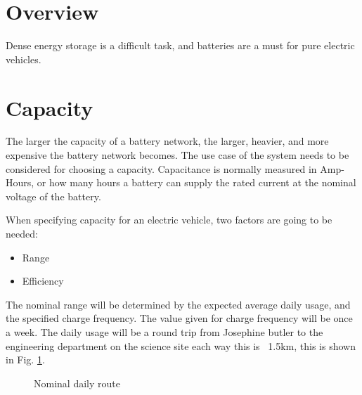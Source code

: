 \documentclass{article}
\begin{document}
\section{Overview}
Dense energy storage is a difficult task, and batteries are a must for pure electric vehicles.
\section{Capacity}
The larger the capacity of a battery network, the larger, heavier, and more expensive the battery network becomes.
The use case of the system needs to be considered for choosing a capacity.
Capacitance is normally measured in Amp-Hours, or how many hours a battery can supply the rated current at the nominal voltage of the battery.

When specifying capacity for an electric vehicle, two factors are going to be needed:
\begin{itemize}
    \item Range
    \item Efficiency
\end{itemize}
The nominal range will be determined by the expected average daily usage, and the specified charge frequency. 
The value given for charge frequency will be once a week.
The daily usage will be a round trip from Josephine butler to the engineering department on the science site each way this is ~1.5km, this is shown in Fig. \ref{fig:route}.
\begin{figure}[H]
    \centering
    \caption{Nominal daily route}
    \label{fig:route}
\end{figure}
\end{document}
